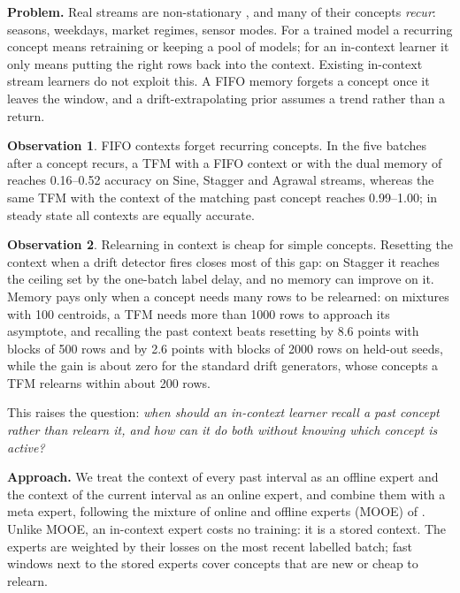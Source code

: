 \documentclass{article}
\theoremstyle{plain}
\theoremstyle{definition}
\newtheorem{observation}{Observation}
\theoremstyle{remark}
\begin{document}
\textbf{Problem.} Real streams are non-stationary \citep{gama2014survey,lu2019learning}, and many of their concepts
\emph{recur}: seasons, weekdays, market regimes, sensor modes. For a trained model a recurring concept means
retraining or keeping a pool of models; for an in-context learner it only means putting the right rows back into the
context. Existing in-context stream learners do not exploit this. A FIFO memory forgets a concept once it leaves the
window, and a drift-extrapolating prior assumes a trend rather than a return.

\begin{observation}\label{obs:forget}
FIFO contexts forget recurring concepts. In the five batches after a concept recurs, a TFM with a FIFO context or
with the dual memory of \citet{lourenco2026streams} reaches 0.16--0.52 accuracy on Sine, Stagger and Agrawal streams,
whereas the same TFM with the context of the matching past concept reaches 0.99--1.00; in steady state all contexts
are equally accurate. 
\end{observation}

\begin{observation}\label{obs:relearn}
Relearning in context is cheap for simple concepts. Resetting the context when a drift detector fires
\citep{gama2014survey} closes most of this gap: on Stagger it reaches the ceiling set by the one-batch label delay,
and no memory can improve on it. Memory pays only when a concept needs many rows to be relearned: on mixtures with
100 centroids, a TFM needs more than 1000 rows to approach its asymptote, and recalling the past context beats
resetting by 8.6 points with blocks of 500 rows and by 2.6 points with blocks of 2000 rows on held-out seeds, while the
gain is about zero for the standard drift generators, whose concepts a TFM relearns within about 200 rows.
\end{observation}

This raises the question: \emph{when should an in-context learner recall a past concept rather than relearn it, and
how can it do both without knowing which concept is active?}

\textbf{Approach.} We treat the context of every past interval as an offline expert and the context of the current
interval as an online expert, and combine them with a meta expert, following the mixture of online and offline
experts (MOOE) of \citet{zhao2025mooe}. Unlike MOOE, an in-context expert costs no training: it is a stored context.
The experts are weighted by their losses on the most recent labelled batch; fast windows
next to the stored experts cover concepts that are new or cheap to relearn.
\end{document}
